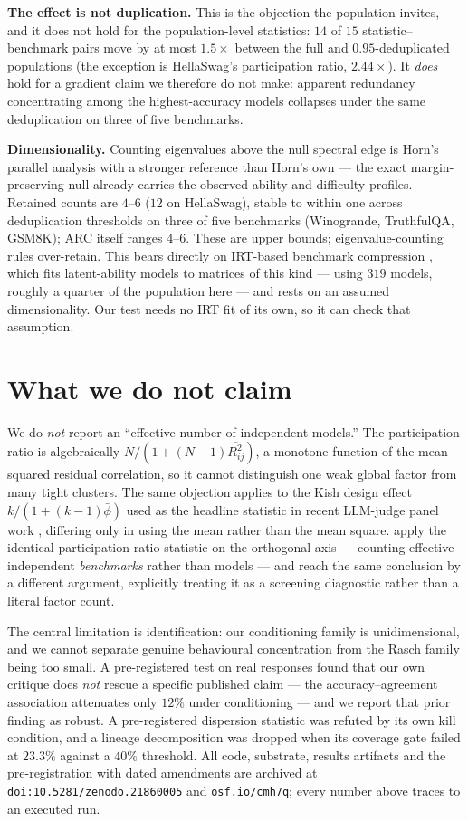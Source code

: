 \documentclass[10pt,letterpaper]{article}
\begin{document}
\textbf{The effect is not duplication.} This is the objection the population invites, and it does
not hold for the population-level statistics: $14$ of $15$ statistic--benchmark pairs move by at
most $1.5\times$ between the full and $0.95$-deduplicated populations (the exception is
HellaSwag's participation ratio, $2.44\times$). It \emph{does} hold for a gradient claim we
therefore do not make: apparent redundancy concentrating among the highest-accuracy models
collapses under the same deduplication on three of five benchmarks.

\textbf{Dimensionality.} Counting eigenvalues above the null spectral edge is Horn's parallel
analysis with a stronger reference than Horn's own --- the exact margin-preserving null already
carries the observed ability and difficulty profiles. Retained counts are $4$--$6$ ($12$ on
HellaSwag), stable to within one across deduplication thresholds on three of five benchmarks
(Winogrande, TruthfulQA, GSM8K); ARC itself ranges $4$--$6$. These
are upper bounds; eigenvalue-counting rules over-retain. This bears directly on IRT-based
benchmark compression \citep{polo2024tiny}, which fits latent-ability models to matrices of this
kind --- using $319$ models, roughly a quarter of the population here --- and rests on an assumed
dimensionality. Our test needs no IRT fit of its own, so it can check that assumption.

\section{What we do not claim}

We do \emph{not} report an ``effective number of independent models.'' The participation ratio is
algebraically $N/(1+(N-1)\overline{R_{ij}^2})$, a monotone function of the mean squared residual
correlation, so it cannot distinguish one weak global factor from many tight clusters. The same
objection applies to the Kish design effect $k/(1+(k-1)\bar\phi)$ used as the headline statistic in
recent LLM-judge panel work \citep{kohli2026nine}, differing only in using the mean rather than
the mean square. \citet{benchscope2026} apply the identical participation-ratio statistic on the
orthogonal axis --- counting effective independent \emph{benchmarks} rather than models --- and
reach the same conclusion by a different argument, explicitly treating it as a screening
diagnostic rather than a literal factor count.

The central limitation is identification: our conditioning family is unidimensional, and we cannot
separate genuine behavioural concentration from the Rasch family being too small. A pre-registered
test on real responses found that our own critique does \emph{not} rescue a specific published
claim --- the accuracy--agreement association attenuates only $12\%$ under conditioning --- and we
report that prior finding as robust. A pre-registered dispersion statistic was refuted by its own
kill condition, and a lineage decomposition was dropped when its coverage gate failed at $23.3\%$
against a $40\%$ threshold. All code, substrate, results artifacts and the pre-registration with
dated amendments are archived at \texttt{doi:10.5281/zenodo.21860005} and \texttt{osf.io/cmh7q};
every number above traces
to an executed run.
\end{document}
